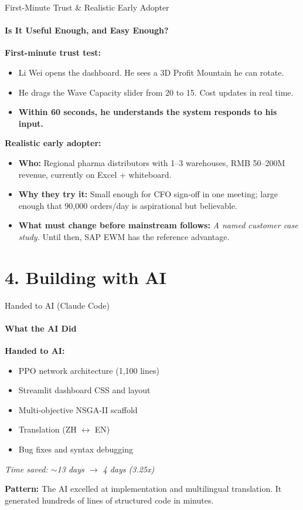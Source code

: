 \documentclass{beamer}
\begin{document}
\begin{frame}{First-Minute Trust \& Realistic Early Adopter}
  \framesubtitle{Is It Useful Enough, and Easy Enough?}
  \small

  \textbf{First-minute trust test:}
  \begin{itemize}
    \item Li Wei opens the dashboard. He sees a 3D Profit Mountain he can rotate.
    \item He drags the Wave Capacity slider from 20 to 15. Cost updates in real time.
    \item \textbf{Within 60 seconds, he understands the system responds to his input.}
  \end{itemize}

  \vspace{0.2cm}
  \textbf{Realistic early adopter:}
  \begin{itemize}
    \item \textbf{Who:} Regional pharma distributors with 1--3 warehouses, RMB 50--200M revenue, currently on Excel + whiteboard.
    \item \textbf{Why they try it:} Small enough for CFO sign-off in one meeting; large enough that 90,000 orders/day is aspirational but believable.
    \item \textbf{What must change before mainstream follows:} \textit{A named customer case study.} Until then, SAP EWM has the reference advantage.
  \end{itemize}
\end{frame}

\section{4. Building with AI}

\begin{frame}{Handed to AI (Claude Code)}
  \framesubtitle{What the AI Did}
  \small

  \textbf{\color{deepgreen}Handed to AI:}
  \begin{itemize}
    \item PPO network architecture (1,100 lines)
    \item Streamlit dashboard CSS and layout
    \item Multi-objective NSGA-II scaffold
    \item Translation (ZH $\leftrightarrow$ EN)
    \item Bug fixes and syntax debugging
  \end{itemize}

  \vspace{0.2cm}
  \textit{Time saved: $\sim$13 days $\rightarrow$ 4 days (3.25x)}

  \vspace{0.2cm}
  \textbf{Pattern:} The AI excelled at implementation and multilingual translation. It generated hundreds of lines of structured code in minutes.
\end{frame}
\end{document}
